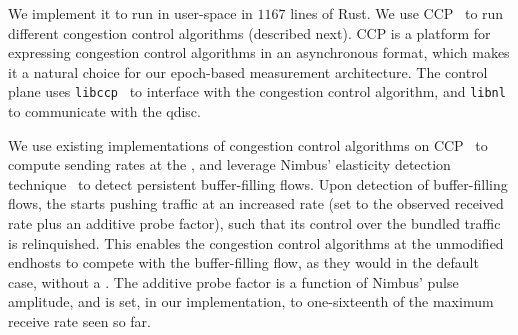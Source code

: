 
 We implement it to run in user-space in $1167$ lines of Rust.
We use CCP~\cite{ccp} to run different congestion control algorithms (described next). CCP is a platform for expressing congestion control algorithms in an asynchronous format, which makes it a natural choice for our epoch-based measurement architecture. The control plane uses \texttt{libccp}~\cite{ccp} to interface with the congestion control algorithm, and  \texttt{libnl} to communicate with the qdisc.

 We use existing implementations of congestion control algorithms on CCP~\cite{nimbus, copa, bbr} to compute sending rates at the \inbox, and leverage Nimbus' elasticity detection technique~\cite{nimbus} to detect persistent buffer-filling flows. Upon detection of buffer-filling flows, the \inbox  starts pushing traffic at an increased rate (set to the observed received rate plus an additive probe factor), such that its control over the bundled traffic is relinquished. This enables the congestion control algorithms at the unmodified endhosts to compete with the buffer-filling flow, as they would in the default case, without a \name. The additive probe factor is a function of Nimbus' pulse amplitude, and is set, in our implementation, to one-sixteenth of the maximum receive rate seen so far.


